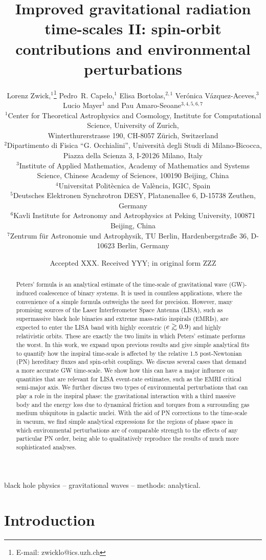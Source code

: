 \documentclass[usenatbib]{mnras}
\title[Improved gravitational radiation time-scales II]{Improved gravitational radiation time-scales II: spin-orbit contributions and environmental perturbations}
\author[L. Zwick et al.]{Lorenz Zwick,$^{1}$\thanks{E-mail: zwicklo@ics.uzh.ch}
Pedro~R. Capelo,$^{1}$
Elisa Bortolas,$^{2,1}$\newauthor
Ver\'{o}nica V\'{a}zquez-Aceves,$^{3}$
Lucio Mayer$^{1}$ and
Pau Amaro-Seoane$^{3,4,5,6,7}$
\\
$^{1}$Center for Theoretical Astrophysics and Cosmology, Institute for Computational Science, University of Zurich,\\ Winterthurerstrasse 190, CH-8057 Z{\"u}rich, Switzerland\\
$^{2}$Dipartimento di Fisica ``G. Occhialini'', Università degli Studi di Milano-Bicocca, Piazza della Scienza 3, I-20126 Milano, Italy\\
$^{3}$Institute of Applied Mathematics, Academy of Mathematics and Systems Science, Chinese Academy of Sciences, 100190 Beijing, China\\
$^{4}$Universitat Polit\`{e}cnica de Val\`{e}ncia, IGIC, Spain\\
$^{5}$Deutsches Elektronen Synchrotron DESY, Platanenallee 6, D-15738 Zeuthen, Germany\\
$^{6}$Kavli Institute for Astronomy and Astrophysics at Peking University, 100871 Beijing, China \\
$^{7}$Zentrum f{\"u}r Astronomie und Astrophysik, TU Berlin, Hardenbergstra{\ss}e 36, D-10623 Berlin, Germany}
\date{Accepted XXX. Received YYY; in original form ZZZ}
\def\gsim{\mathrel{\rlap{\lower 3pt \hbox{$\sim$}} \raise 2.0pt \hbox{$>$}}}
\begin{document}
\label{firstpage}

\pagerange{\pageref{firstpage}--\pageref{lastpage}}

\maketitle


\begin{abstract}
Peters' formula is an analytical estimate of the time-scale of gravitational wave (GW)-induced coalescence of binary systems. It is used in countless applications, where the convenience of a simple formula outweighs the need for precision. However, many promising sources of the Laser Interferometer Space Antenna (LISA), such as supermassive black hole binaries and extreme mass-ratio inspirals (EMRIs), are expected to enter the LISA band with highly eccentric ($e \gsim 0.9$) and highly relativistic orbits. These are exactly the two limits in which Peters' estimate performs the worst. In this work, we expand upon previous results and give simple analytical fits to quantify how the inspiral time-scale is affected by the relative 1.5 post-Newtonian (PN) hereditary fluxes and spin-orbit couplings. We discuss several cases that demand a more accurate GW time-scale. We show how this can have a major influence on quantities that are relevant for LISA event-rate estimates, such as the EMRI critical semi-major axis. We further discuss two types of environmental perturbations that can play a role in the inspiral phase: the gravitational interaction with a third massive body and the energy loss due to dynamical friction and torques from a surrounding gas medium ubiquitous in galactic nuclei. With the aid of PN corrections to the time-scale in vacuum, we find simple analytical expressions for the regions of phase space in which environmental perturbations are of comparable strength to the effects of any particular PN order, being able to qualitatively reproduce the results of much more sophisticated analyses.
\end{abstract}

\begin{keywords}
black hole physics -- gravitational waves -- methods: analytical.
\end{keywords}


\section{Introduction}\label{sec:introduction}
\end{document}
